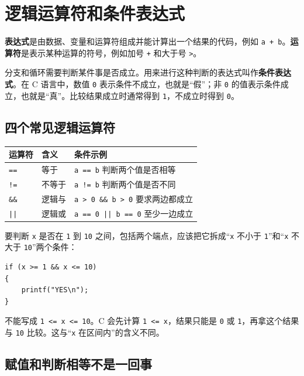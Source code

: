 \documentclass[UTF8,zihao=-4,fontset=windows]{ctexart}
\newcommand{\term}[1]{\textbf{\color{navy}#1}}
\begin{document}
\section{逻辑运算符和条件表达式}

\term{表达式}是由数据、变量和运算符组成并能计算出一个结果的代码，例如 \verb|a + b|。\term{运算符}是表示某种运算的符号，例如加号 \verb|+| 和大于号 \verb|>|。

分支和循环需要判断某件事是否成立。用来进行这种判断的表达式叫作\term{条件表达式}。在 C 语言中，数值 \verb|0| 表示条件不成立，也就是“假”；非 \verb|0| 的值表示条件成立，也就是“真”。比较结果成立时通常得到 \verb|1|，不成立时得到 \verb|0|。

\subsection{四个常见逻辑运算符}

\begin{center}
\begin{tabularx}{0.91\textwidth}{>{\centering\arraybackslash}p{2cm} p{2.8cm} X}
\toprule
运算符 & 含义 & 条件示例 \\
\midrule
\texttt{==} & 等于 & \texttt{a == b} 判断两个值是否相等 \\
\texttt{!=} & 不等于 & \texttt{a != b} 判断两个值是否不同 \\
\texttt{\&\&} & 逻辑与 & \texttt{a > 0 \&\& b > 0} 要求两边都成立 \\
\texttt{||} & 逻辑或 & \texttt{a == 0 || b == 0} 至少一边成立 \\
\bottomrule
\end{tabularx}
\end{center}

要判断 \verb|x| 是否在 \verb|1| 到 \verb|10| 之间，包括两个端点，应该把它拆成“\verb|x| 不小于 \verb|1|”和“\verb|x| 不大于 \verb|10|”两个条件：

\begin{lstlisting}[style=cstyle]
if (x >= 1 && x <= 10)
{
    printf("YES\n");
}
\end{lstlisting}

不能写成 \verb|1 <= x <= 10|。C 会先计算 \verb|1 <= x|，结果只能是 \verb|0| 或 \verb|1|，再拿这个结果与 \verb|10| 比较。这与“\verb|x| 在区间内”的含义不同。

\subsection{赋值和判断相等不是一回事}
\end{document}
